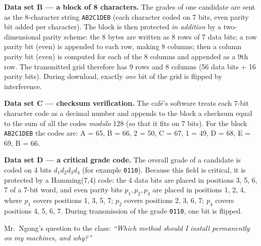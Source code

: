 \documentclass[11pt]{article}
\newcommand{\cle}[1]{{\popxbold\color{popdark}#1}}
\newcounter{popsec}
\newcounter{popsub}
\newcommand{\courssub}[1]{%
  \stepcounter{popsub}%
  \par\vspace{9pt}\noindent{\popxbold\fontsize{11.5}{13}\selectfont\color{popink}{\color{poporange}\thepopsec.\thepopsub}\hspace{6pt}#1}\par\nopagebreak\vspace{4pt}
}
\begin{document}
\begin{experience}
\textbf{Data set B --- a block of 8 characters.} The grades of one candidate are sent as the 8-character string \texttt{AB2C1DEB} (each character coded on 7 bits, even parity bit added per character). The block is then protected \emph{in addition} by a two-dimensional parity scheme: the 8 bytes are written as 8 rows of 7 data bits; a row parity bit (even) is appended to each row, making 8 columns; then a column parity bit (even) is computed for each of the 8 columns and appended as a 9th row. The transmitted grid therefore has 9 rows and 8 columns (56 data bits + 16 parity bits). During download, exactly \emph{one} bit of the grid is flipped by interference.

\textbf{Data set C --- checksum verification.} The café's software treats each 7-bit character code as a decimal number and appends to the block a \cle{checksum} equal to the sum of all the codes \emph{modulo} 128 (so that it fits on 7 bits). For the block \texttt{AB2C1DEB} the codes are: A = 65, B = 66, 2 = 50, C = 67, 1 = 49, D = 68, E = 69, B = 66.

\textbf{Data set D --- a critical grade code.} The overall grade of a candidate is coded on 4 bits $d_1d_2d_3d_4$ (for example \texttt{0110}). Because this field is critical, it is protected by a \cle{Hamming(7,4)} code: the 4 data bits are placed in positions 3, 5, 6, 7 of a 7-bit word, and even parity bits $p_1, p_2, p_4$ are placed in positions 1, 2, 4, where $p_1$ covers positions 1, 3, 5, 7; $p_2$ covers positions 2, 3, 6, 7; $p_4$ covers positions 4, 5, 6, 7. During transmission of the grade \texttt{0110}, one bit is flipped.

Mr.\ Ngong's question to the class: \emph{``Which method should I install permanently on my machines, and why?''}
\end{experience}

\courssub{Tasks}
\end{document}
